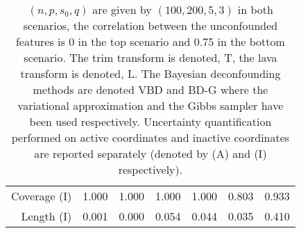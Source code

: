 \documentclass[11pt]{article}
\numberwithin{equation}{section}
\begin{document}
\begin{table}[h]
\begin{tabular}{r|cc|cc|cc}
Coverage (I)   & 1.000 & 1.000 & 1.000 & 1.000 & 0.803  & 0.933 \\
Length (I)     & 0.001 & 0.000 & 0.054 & 0.044 & 0.035  & 0.410 \\
\bottomrule
\end{tabular}
\caption{$(n, p, s_0, q) $ are given by $(100, 200, 5, 3)$ in both scenarios, the correlation between the unconfounded features is 0 in the top scenario and 0.75 in the bottom scenario. The trim transform is denoted, T, the lava transform is denoted, L. The Bayesian deconfounding methods are denoted VBD and BD-G where the variational approximation and the Gibbs sampler have been used respectively. Uncertainty quantification performed on active coordinates and inactive coordinates are reported separately (denoted by (A) and (I) respectively). }
\label{Tab:UQ}
\end{table}

\end{document}
